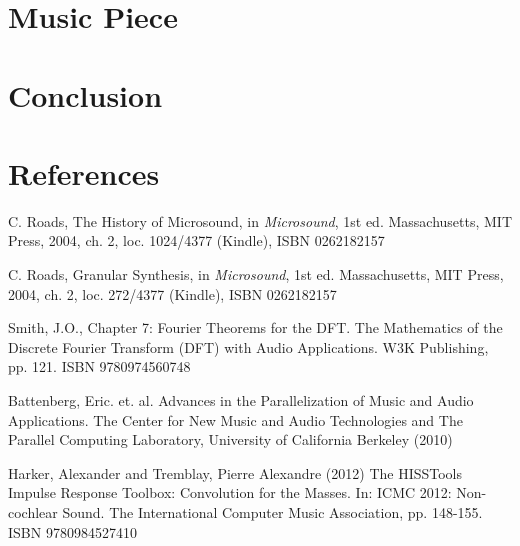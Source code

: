 \documentclass{article}
\begin{document}
	\section{Music Piece}
	\section{Conclusion}
	\section{References}
		\begin{thebibliography}{99}
		 C. Roads, The History of Microsound, in \emph{Microsound}, 1st ed. Massachusetts, MIT Press, 2004, ch. 2, loc. 1024/4377 (Kindle), ISBN 0262182157

		 C. Roads, Granular Synthesis, in \emph{Microsound}, 1st ed. Massachusetts, MIT Press, 2004, ch. 2, loc. 272/4377 (Kindle), ISBN 0262182157

		 Smith, J.O., Chapter 7: Fourier Theorems for the DFT. The Mathematics of the Discrete Fourier Transform (DFT) with Audio Applications. W3K Publishing, pp. 121. ISBN 9780974560748

		 Battenberg, Eric. et. al. Advances in the Parallelization of Music and Audio Applications. The Center for New Music and Audio Technologies and The Parallel Computing Laboratory, University of California Berkeley (2010)

		 Harker, Alexander and Tremblay, Pierre Alexandre (2012) The HISSTools Impulse Response Toolbox: Convolution for the Masses. In: ICMC 2012: Non-cochlear Sound. The International Computer Music Association, pp. 148-155. ISBN 9780984527410
		\end{thebibliography}
\end{document}
